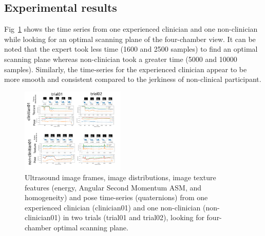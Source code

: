 \documentclass[a4paper, 10pt, conference]{ieeeconf}      %
\begin{document}
\subsection{Experimental results}
Fig~\ref{fig:results} shows the time series from one experienced clinician and one non-clinician while looking for an optimal scanning plane of the four-chamber view.
It can be noted that the expert took less time (1600 and 2500 samples) to find an optimal scanning plane whereas non-clinician took a greater time (5000 and 10000 samples).
Similarly, the time-series for the experienced clinician appear to be more smooth and consistent compared to the jerkiness of non-clinical participant. 
\begin{figure}[t]
\centering
\includegraphics[width=0.44\textwidth]{results-02-participants-02-trials/outputs/drawing-v00} %
\caption{
Ultrasound image frames, image distributions, image texture features (energy, Angular Second Momentum ASM, and homogeneity) and pose time-series (quaternions) from one experienced clinician (clinician01) and one non-clinician (non-clinician01) in two trials (trial01 and trial02), looking for four-chamber optimal scanning plane. 
       } 
\label{fig:results}
\end{figure}

 
\end{document}
